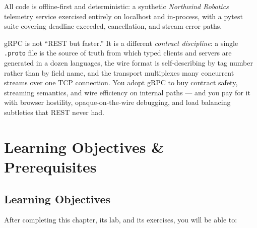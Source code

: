 All code is offline-first and deterministic: a synthetic \emph{Northwind
Robotics} telemetry service exercised entirely on localhost and in-process, with
a pytest suite covering deadline exceeded, cancellation, and stream error paths.

\begin{keyconceptbox}
gRPC is not ``REST but faster.'' It is a different \emph{contract discipline}: a
single \texttt{.proto} file is the source of truth from which typed clients and
servers are generated in a dozen languages, the wire format is self-describing by
tag number rather than by field name, and the transport multiplexes many
concurrent streams over one TCP connection. You adopt gRPC to buy contract
safety, streaming semantics, and wire efficiency on internal paths --- and you
pay for it with browser hostility, opaque-on-the-wire debugging, and load
balancing subtleties that REST never had.
\end{keyconceptbox}

\section{Learning Objectives \& Prerequisites}
\label{sec:ch13-objectives}

\subsection*{Learning Objectives}
After completing this chapter, its lab, and its exercises, you will be able to:

